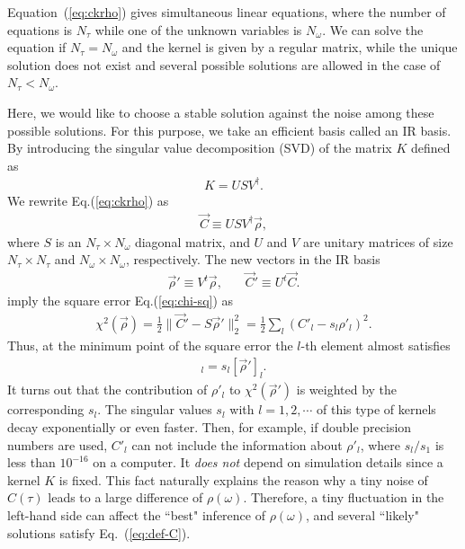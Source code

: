 \documentclass[a4paper,11pt]{article}
\newcommand\beq{ \begin{eqnarray} }
\newcommand\eeq{ \end{eqnarray} }
\begin{document}
Equation~(\ref{eq:ckrho}) gives simultaneous linear equations, where the number of equations is $N_\tau$ while one of the unknown variables is $N_\omega$.
We can solve the equation if $N_\tau = N_\omega$ and the kernel is given by a regular matrix, while the unique solution does not exist and several possible solutions are allowed in the case of $N_\tau < N_\omega$.

Here, we would like to choose a stable solution against the noise among these possible solutions.
For this purpose, we take an efficient basis called an IR basis.
By introducing the singular value decomposition (SVD) of the matrix $K$ defined as 
\beq
K = U S V^\dag.
\eeq
We rewrite Eq.(\ref{eq:ckrho}) as 
\beq
\vec{C} \equiv  U S V^\dag \vec{\rho},
\eeq
where $S$ is an $N_\tau \times N_\omega$ diagonal matrix, and $U$ and $V$ are unitary matrices of size $N_\tau \times N_\tau$ and $N_\omega \times N_\omega$, respectively.
The new vectors in the IR basis
\beq
\vec{\rho}' \equiv V^t \vec{\rho}, ~~~~~~~~ \vec{C}' \equiv U^t \vec{C}.\label{eq:rho-C-IR-basis}
\eeq
imply the square error Eq.(\ref{eq:chi-sq}) as
\beq
\chi^2(\vec{\rho}) = \frac{1}{2} \| \vec{C}' - S \vec{\rho}' \|^2_2 = \frac{1}{2} \sum_l (C'_l - s_l \rho'_l)^2.\label{eq:chi-sq-SVD}
\eeq
Thus, at the minimum point of the square error the $l$-th element  almost satisfies 
\beq
 [\vec{C}']_l =  s_{l} [\vec{\rho}']_l.\label{eq:Cl-sl-rhol}
\eeq
It turns out that the contribution of $\rho'_l$ to $\chi^2 (\vec{\rho}')$ is weighted by the corresponding $s_l$.
The singular values $s_l$ with $l = 1,2,\cdots $ of this type of kernels decay exponentially or even faster.
Then, for example, if double precision numbers are used, $C'_l$ can not include the information about $\rho'_l$, where $s_{l}/s_{1}$ is less than $10^{-16}$ on a computer.
It {\it does not } depend on simulation details since a kernel $K$ is fixed. 
This fact naturally  explains the reason why a tiny noise of $C(\tau)$ leads to a large difference of $\rho(\omega)$. 
Therefore, a tiny fluctuation in the left-hand side can affect the ``best" inference of $\rho(\omega)$, and several ``likely" solutions satisfy Eq.~(\ref{eq:def-C}).
\end{document}
